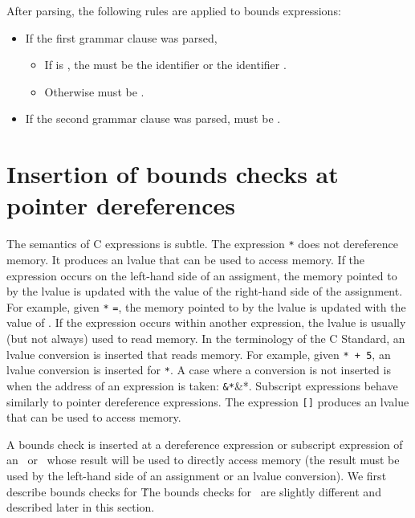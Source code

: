 After parsing, the following rules are applied to bounds
expressions:
\begin{itemize}
\item If the first grammar clause was parsed,
\begin{itemize}
\item If  is , the 
must be the identifier  or the identifier .
\item Otherwise  must be .
\end{itemize}
\item If the second grammar clause was parsed,  must be
.
\end{itemize}

\section{Insertion of bounds checks at pointer dereferences}

\label{section:bounds-checking-indirections}
The semantics of C expressions is subtle.  The expression
\lstinline|*| does not dereference memory.  It
produces an lvalue that can be used to access memory. If the expression
occurs on the left-hand side of an assigment, the memory pointed to
by the lvalue is updated with the value of the right-hand side of
the assignment.
For example, given \lstinline|*| \lstinline|=|,
the memory pointed to by the lvalue is updated with the value of .
If the expression occurs within another expression, the lvalue is usually
(but not always)  used to read memory.  In the terminology of the C Standard,
an lvalue conversion is inserted that reads memory. For example, given
\lstinline|*|\lstinline| + 5|,
an lvalue conversion is inserted for \lstinline|*|.  A case where a
conversion is not inserted is  when the address of an expression is taken:
\lstinline|&*|\&*. Subscript expressions behave similarly to pointer
dereference expressions.  The expression \lstinline|[|\lstinline|]| produces
an lvalue that can be used to access memory.

A bounds check is inserted at a dereference expression or subscript expression
of an \arrayptr\ or \ntarrayptr\ whose result will be used to directly
access memory (the result must be used by the left-hand side of an
assignment or an lvalue conversion).   We first describe bounds checks
for \arrayptr\.   The bounds checks for \ntarrayptr\ are slightly
different and described later in this section.

